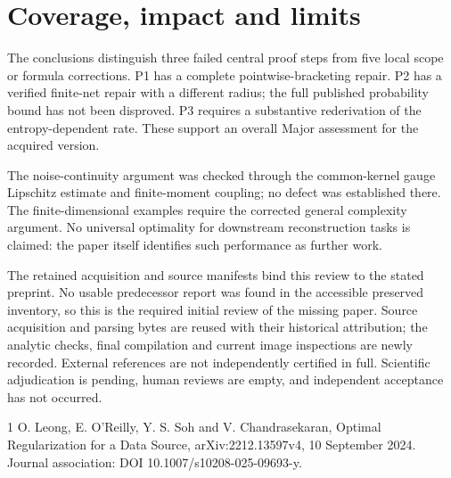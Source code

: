 \documentclass[10pt]{article}
\begin{document}
\section*{Coverage, impact and limits}
The conclusions distinguish three failed central proof steps from five local scope or formula corrections. P1 has a complete pointwise-bracketing repair. P2 has a verified finite-net repair with a different radius; the full published probability bound has not been disproved. P3 requires a substantive rederivation of the entropy-dependent rate. These support an overall Major assessment for the acquired version.\par
The noise-continuity argument was checked through the common-kernel gauge Lipschitz estimate and finite-moment coupling; no defect was established there. The finite-dimensional examples require the corrected general complexity argument. No universal optimality for downstream reconstruction tasks is claimed: the paper itself identifies such performance as further work.\par
The retained acquisition and source manifests bind this review to the stated preprint. No usable predecessor report was found in the accessible preserved inventory, so this is the required initial review of the missing paper. Source acquisition and parsing bytes are reused with their historical attribution; the analytic checks, final compilation and current image inspections are newly recorded. External references are not independently certified in full. Scientific adjudication is pending, human reviews are empty, and independent acceptance has not occurred.\par
1 O. Leong, E. O’Reilly, Y. S. Soh and V. Chandrasekaran, Optimal Regularization for a Data Source, arXiv:2212.13597v4, 10 September 2024. Journal association: DOI 10.1007/s10208-025-09693-y.\par
\end{document}

